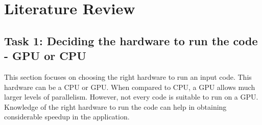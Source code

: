 \documentclass[a4paper,11pt]{article}
\begin{document}
\section{Literature Review}
\subsection{Task 1: Deciding the hardware to run the code -  GPU or CPU}
\indent\indent This section focuses on choosing the right hardware to run an input code. This hardware can be a CPU or GPU. When compared to CPU, a GPU allows much larger levels of parallelism. However, not every code is suitable to run on a GPU. Knowledge of the right hardware to run the code can help in obtaining considerable speedup in the application.
\end{document}
